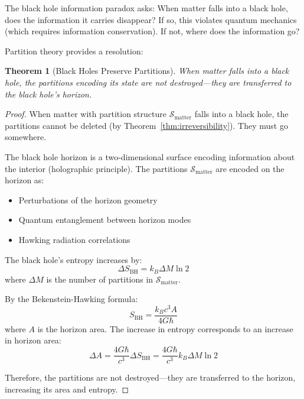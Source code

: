 \documentclass[twocolumn,10pt]{article}
\newtheorem{theorem}{Theorem}[section]
\theoremstyle{definition}
\theoremstyle{remark}
\begin{document}
The black hole information paradox\cite{hawking1976} asks: When matter falls into a black hole, does the information it carries disappear? If so, this violates quantum mechanics (which requires information conservation). If not, where does the information go?

\vspace{0.2cm}
\noindent Partition theory provides a resolution:

\begin{theorem}[Black Holes Preserve Partitions]
\label{thm:black_holes_preserve_partitions}
When matter falls into a black hole, the partitions encoding its state are not destroyed—they are transferred to the black hole's horizon.
\end{theorem}

\begin{proof}
When matter with partition structure $\mathcal{S}_{\text{matter}}$ falls into a black hole, the partitions cannot be deleted (by Theorem~\ref{thm:irreversibility}). They must go somewhere.

The black hole horizon is a two-dimensional surface encoding information about the interior (holographic principle\cite{thooft1993,susskind1995}). The partitions $\mathcal{S}_{\text{matter}}$ are encoded on the horizon as:
\begin{itemize}
\item Perturbations of the horizon geometry
\item Quantum entanglement between horizon modes
\item Hawking radiation correlations\cite{hawking1975}
\end{itemize}

The black hole's entropy increases by:
\begin{equation}
\Delta S_{\text{BH}} = k_B \Delta M \ln 2
\end{equation}
where $\Delta M$ is the number of partitions in $\mathcal{S}_{\text{matter}}$.

By the Bekenstein-Hawking formula\cite{bekenstein1973,hawking1975}:
\begin{equation}
S_{\text{BH}} = \frac{k_B c^3 A}{4 G \hbar}
\end{equation}
where $A$ is the horizon area. The increase in entropy corresponds to an increase in horizon area:
\begin{equation}
\Delta A = \frac{4 G \hbar}{c^3} \Delta S_{\text{BH}} = \frac{4 G \hbar}{c^3} k_B \Delta M \ln 2
\end{equation}

Therefore, the partitions are not destroyed—they are transferred to the horizon, increasing its area and entropy.
\end{proof}
\end{document}
